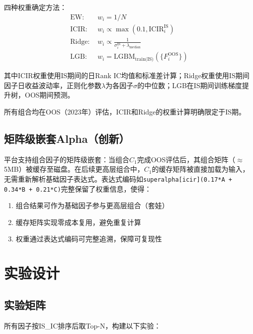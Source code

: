 \documentclass[11pt,a4paper]{ctexart}
\begin{document}
四种权重确定方法：
\begin{align}
\text{EW: } & w_i = 1/N \\
\text{ICIR: } & w_i \propto \max(0.1, \text{ICIR}_i^{\text{IS}}) \\
\text{Ridge: } & w_i \propto \frac{1}{\sigma_i^{\text{IS}} + \lambda_{\text{median}}} \\
\text{LGB: } & w_i = \text{LGBM}_{\text{train(IS)}}(\{F_i^{\text{OOS}}\})
\end{align}

其中ICIR权重使用IS期间的日Rank IC均值和标准差计算；Ridge权重使用IS期间因子日收益波动率，正则化参数$\lambda$为各因子$\sigma$的中位数；LGB在IS期间训练梯度提升树，OOS期间预测。

所有组合均在OOS（2023年）评估，ICIR和Ridge的权重计算明确限定于IS期。

\subsection{矩阵级嵌套Alpha（创新）}

平台支持组合因子的矩阵级嵌套：当组合$C_1$完成OOS评估后，其组合矩阵（$\approx$5MB）被缓存至磁盘。在后续更高层组合中，$C_1$的缓存矩阵被直接加载为输入，无需重新解析基础因子表达式。表达式编码如\texttt{superalpha[icir](0.17*A + 0.34*B + 0.21*C)}完整保留了权重信息，使得：

\begin{enumerate}[nosep]
    \item 组合结果可作为基础因子参与更高层组合（套娃）
    \item 缓存矩阵实现零成本复用，避免重复计算
    \item 权重通过表达式编码可完整追溯，保障可复现性
\end{enumerate}

\section{实验设计}

\subsection{实验矩阵}

所有因子按IS\_IC排序后取Top-N，构建以下实验：
\end{document}
